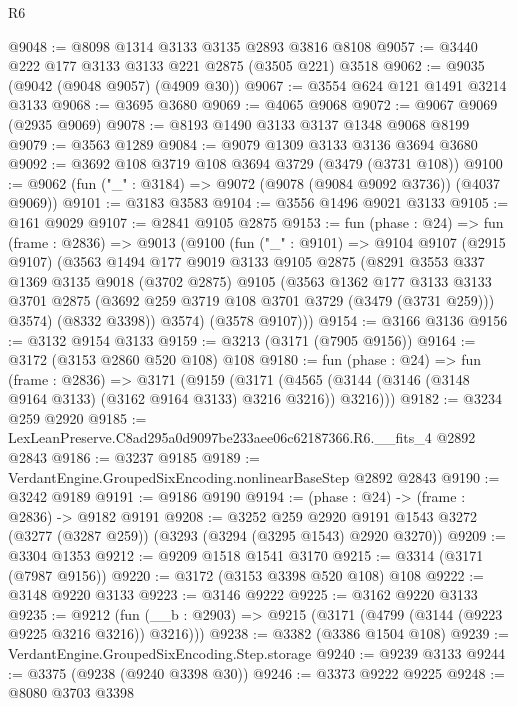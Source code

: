 \begin{lexlean}{R6}
\begin{coremodule}
@9048 := @8098 @1314 @3133 @3135 @2893 @3816 @8108
@9057 := @3440 @222 @177 @3133 @3133 @221 @2875 (@3505 @221) @3518
@9062 := @9035 (@9042 (@9048 @9057) (@4909 @30))
@9067 := @3554 @624 @121 @1491 @3214 @3133
@9068 := @3695 @3680
@9069 := @4065 @9068
@9072 := @9067 @9069 (@2935 @9069)
@9078 := @8193 @1490 @3133 @3137 @1348 @9068 @8199
@9079 := @3563 @1289
@9084 := @9079 @1309 @3133 @3136 @3694 @3680
@9092 := @3692 @108 @3719 @108 @3694 @3729 (@3479 (@3731 @108))
@9100 := @9062 (fun ("_" : @3184) => @9072 (@9078 (@9084 @9092 @3736)) (@4037 @9069))
@9101 := @3183 @3583
@9104 := @3556 @1496 @9021 @3133
@9105 := @161 @9029
@9107 := @2841 @9105 @2875
@9153 := fun (phase : @24) =>
  fun (frame : @2836) =>
  @9013
    (@9100
      (fun ("_" : @9101) =>
      @9104
        @9107
        (@2915 @9107)
        (@3563
          @1494
          @177
          @9019
          @3133
          @9105
          @2875
          (@8291
            @3553
            @337
            @1369
            @3135
            @9018
            (@3702 @2875)
            @9105
            (@3563
              @1362
              @177
              @3133
              @3133
              @3701
              @2875
              (@3692 @259 @3719 @108 @3701 @3729 (@3479 (@3731 @259)))
              @3574)
            (@8332 @3398))
          @3574)
        (@3578 @9107)))
@9154 := @3166 @3136
@9156 := @3132 @9154 @3133
@9159 := @3213 (@3171 (@7905 @9156))
@9164 := @3172 (@3153 @2860 @520 @108) @108
@9180 := fun (phase : @24) =>
  fun (frame : @2836) =>
  @3171
    (@9159
      (@3171 (@4565 (@3144 (@3146 (@3148 @9164 @3133) (@3162 @9164 @3133) @3216 @3216)) @3216)))
@9182 := @3234 @259 @2920
@9185 := LexLeanPreserve.C8ad295a0d9097be233aee06c62187366.R6.__fits_4 @2892 @2843
@9186 := @3237 @9185
@9189 := VerdantEngine.GroupedSixEncoding.nonlinearBaseStep @2892 @2843
@9190 := @3242 @9189
@9191 := @9186 @9190
@9194 := (phase : @24) -> (frame : @2836) -> @9182 @9191
@9208 := @3252
    @259
    @2920
    @9191
    @1543
    @3272
    (@3277 (@3287 @259))
    (@3293 (@3294 (@3295 @1543) @2920 @3270))
@9209 := @3304 @1353
@9212 := @9209 @1518 @1541 @3170
@9215 := @3314 (@3171 (@7987 @9156))
@9220 := @3172 (@3153 @3398 @520 @108) @108
@9222 := @3148 @9220 @3133
@9223 := @3146 @9222
@9225 := @3162 @9220 @3133
@9235 := @9212 (fun (__b : @2903) => @9215 (@3171 (@4799 (@3144 (@9223 @9225 @3216 @3216)) @3216)))
@9238 := @3382 (@3386 @1504 @108)
@9239 := VerdantEngine.GroupedSixEncoding.Step.storage
@9240 := @9239 @3133
@9244 := @3375 (@9238 (@9240 @3398 @30))
@9246 := @3373 @9222 @9225
@9248 := @8080 @3703 @3398

\end{coremodule}
\end{lexlean}
